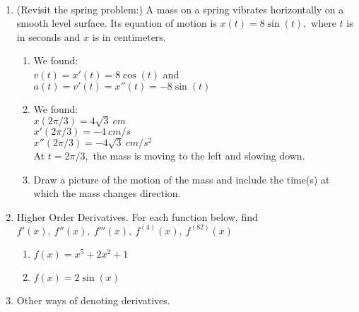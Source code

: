 \documentclass[11pt,fleqn]{article}
\begin{document}
\renewcommand{\headrulewidth}{0pt}
\newcommand{\blank}[1]{\rule{#1}{0.75pt}}
\newcommand{\bc}{\begin{center}}
\newcommand{\ec}{\end{center}}
\renewcommand{\d}{\displaystyle}

\vspace*{-0.7in}

\begin{center}
  \large
  \\
\end{center}
\begin{enumerate}

\item (Revisit the spring problem:)  A mass on a spring vibrates horizontally on a smooth level surface. Its equation of motion is $x(t)=8 \sin(t),$  where $t$ is in seconds and $x$ is in centimeters.\\
	\begin{enumerate}
	\item We found:\\
	$v(t)=x'(t)=8 \cos(t)$ and $a(t)=v'(t)=x''(t)=-8\sin(t)$
	\vspace{0.5in}
	\item We found: \\
	$x(2\pi / 3)= 4\sqrt{3} \: cm$\\
	$x'(2\pi / 3)= -4 \: cm/s$\\
	$x''(2\pi / 3)= -4\sqrt{3} \: cm/s^2$\\
	At $t=2\pi / 3,$ the mass is moving to the left and slowing down.
	\item Draw a picture of the motion of the mass and include the time(s) at which the mass changes direction.
	\vfill
	 \end{enumerate}
	 
\item Higher Order Derivatives. For each function below, find $f'(x),\: f''(x),\:f'''(x),\:f^{(4)}(x),\:f^{(82)}(x)$
	\begin{enumerate}
	\item $f(x)=x^5+2x^2+1$
	\vspace{1in}
	\item $f(x)=2\sin(x)$
	\vspace{1in}
	\end{enumerate}
\newpage
\item Other ways of denoting derivatives.
\end{enumerate}
\end{document}
